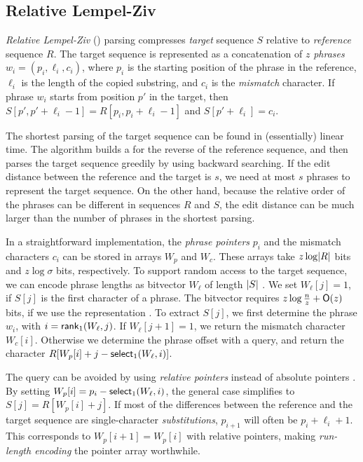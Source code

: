 \subsection{Relative Lempel-Ziv}\label{sect:rlz}

\emph{Relative Lempel-Ziv} (\RLZ) parsing \cite{Kuruppu2010} compresses
\emph{target} sequence $S$ relative to \emph{reference} sequence $R$. The
target sequence is represented as a concatenation of $z$ \emph{phrases} $w_{i}
= (p_{i}, \ell_{i}, c_{i})$, where $p_{i}$ is the starting position of the
phrase in the reference, $\ell_{i}$ is the length of the copied substring, and
$c_{i}$ is the \emph{mismatch} character. If phrase $w_{i}$ starts from
position $p'$ in the target, then $S[p',p'+\ell_{i}-1] =
R[p_{i},p_{i}+\ell_{i}-1]$ and $S[p'+\ell_{i}] = c_{i}$.

The shortest \RLZ{} parsing of the target sequence can be found in
(essentially) linear time. The algorithm builds a \CSA{} for the reverse of
the reference sequence, and then parses the target sequence greedily by using
backward searching. If the edit distance between the reference and the target
is $s$, we need at most $s$ phrases to represent the target sequence. On the
other hand, because the relative order of the phrases can be different in
sequences $R$ and $S$, the edit distance can be much larger than the number of
phrases in the shortest \RLZ{} parsing.

In a straightforward implementation, the \emph{phrase pointers} $p_{i}$ and
the mismatch characters $c_{i}$ can be stored in arrays $W_{p}$ and
$W_{c}$. These arrays take $z \log \lvert R \rvert$ bits and $z \log \sigma$ bits,
respectively. To support random access to the target sequence, we can encode
phrase lengths as bitvector $W_{\ell}$ of length $\lvert S \rvert$ \cite{Kuruppu2010}.
We set $W_{\ell}[j] = 1$, if $S[j]$ is the first character of a phrase. The
bitvector requires $z \log \frac{n}{z} + \mathsf{O}(z)$ bits, if we use the
\sdarray{} representation \cite{Okanohara2007}. To extract $S[j]$, we first
determine the phrase $w_{i}$, with $i = \mathsf{rank}_{1}(W_{\ell}, j)$. If
$W_{\ell}[j+1] = 1$, we return the mismatch character $W_{c}[i]$. Otherwise
we determine the phrase offset with a \select{} query, and return the character
$R[W_{p}[i] + j - \mathsf{select}_{1}(W_{\ell}, i)]$.

The \select{} query can be avoided by using \emph{relative pointers} instead
of absolute pointers \cite{Ferrada2014}. By setting $W_{p}[i] = p_{i} -
\mathsf{select}_{1}(W_{\ell}, i)$, the general case simplifies to $S[j] = R[W_{p}[i]
+ j]$. If most of the differences between the reference and the target
sequence are single-character \emph{substitutions}, $p_{i+1}$ will often be
$p_{i} + \ell_{i} + 1$. This corresponds to $W_{p}[i+1] = W_{p}[i]$ with
relative pointers, making \emph{run-length encoding} the pointer array
worthwhile.


